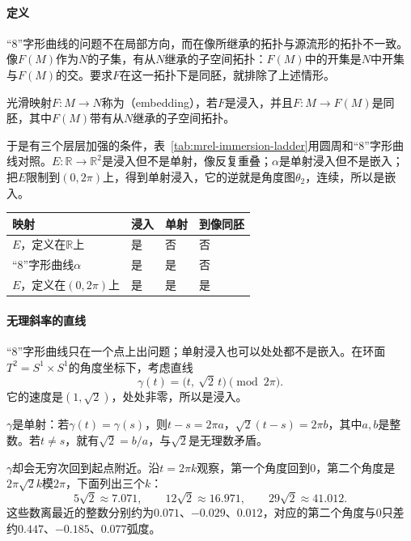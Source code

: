 \paragraph{定义}
“8”字形曲线的问题不在局部方向，而在像所继承的拓扑与源流形的拓扑不一致。像$F(M)$作为$N$的子集，有从$N$继承的子空间拓扑：$F(M)$中的开集是$N$中开集与$F(M)$的交。要求$F$在这一拓扑下是同胚，就排除了上述情形。

\begin{definition}[嵌入]
\label{def:mrel-embedding}
光滑映射$F:M\to N$称为（embedding），若$F$是浸入，并且$F:M\to F(M)$是同胚，其中$F(M)$带有从$N$继承的子空间拓扑。
\end{definition}

于是有三个层层加强的条件，表~\ref{tab:mrel-immersion-ladder}用圆周和“8”字形曲线对照。$E:\mathbb R\to\mathbb R^2$是浸入但不是单射，像反复重叠；$\alpha$是单射浸入但不是嵌入；把$E$限制到$(0,2\pi)$上，得到单射浸入，它的逆就是角度图$\theta_2$，连续，所以是嵌入。

\begin{BookInlineTable}
  \centering
  \begin{tabular}{llll}
    \toprule
    映射 & 浸入 & 单射 & 到像同胚\\
    \midrule
    $E$，定义在$\mathbb R$上 & 是 & 否 & 否\\
    “8”字形曲线$\alpha$ & 是 & 是 & 否\\
    $E$，定义在$(0,2\pi)$上 & 是 & 是 & 是\\
    \bottomrule
  \end{tabular}
  \caption{浸入、单射浸入与嵌入。}
  \label{tab:mrel-immersion-ladder}
\end{BookInlineTable}

\paragraph{无理斜率的直线}
“8”字形曲线只在一个点上出问题；单射浸入也可以处处都不是嵌入。在环面$T^2=S^1\times S^1$的角度坐标下，考虑直线
\[
\gamma(t)=\bigl(t,\ \sqrt2\,t\bigr)\pmod{2\pi}.
\]
它的速度是$(1,\sqrt2)$，处处非零，所以是浸入。

$\gamma$是单射：若$\gamma(t)=\gamma(s)$，则$t-s=2\pi a$，$\sqrt2(t-s)=2\pi b$，其中$a,b$是整数。若$t\neq s$，就有$\sqrt2=b/a$，与$\sqrt2$是无理数矛盾。

$\gamma$却会无穷次回到起点附近。沿$t=2\pi k$观察，第一个角度回到$0$，第二个角度是$2\pi\sqrt2k$模$2\pi$，下面列出三个$k$：
\[
5\sqrt2\approx7.071,\qquad 12\sqrt2\approx16.971,\qquad 29\sqrt2\approx41.012.
\]
这些数离最近的整数分别约为$0.071$、$-0.029$、$0.012$，对应的第二个角度与$0$只差约$0.447$、$-0.185$、$0.077$弧度。

